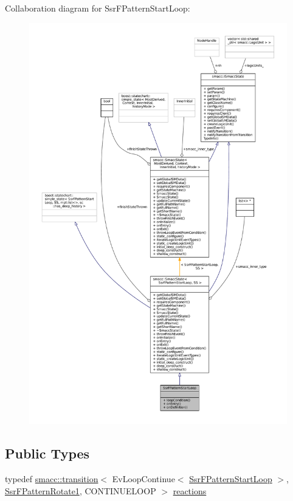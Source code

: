 Collaboration diagram for Ssr\+F\+Pattern\+Start\+Loop\+:
\nopagebreak
\begin{figure}[H]
\begin{center}
\leavevmode
\includegraphics[width=350pt]{structSsrFPatternStartLoop__coll__graph}
\end{center}
\end{figure}
\subsection*{Public Types}
\begin{DoxyCompactItemize}
\item 
typedef \hyperlink{classsmacc_1_1transition}{smacc\+::transition}$<$ Ev\+Loop\+Continue$<$ \hyperlink{structSsrFPatternStartLoop}{Ssr\+F\+Pattern\+Start\+Loop} $>$, \hyperlink{structSsrFPatternRotate1}{Ssr\+F\+Pattern\+Rotate1}, C\+O\+N\+T\+I\+N\+U\+E\+L\+O\+OP $>$ \hyperlink{structSsrFPatternStartLoop_aac85f43e96a9f790df66bf07d1dffc75}{reactions}
\end{DoxyCompactItemize}
